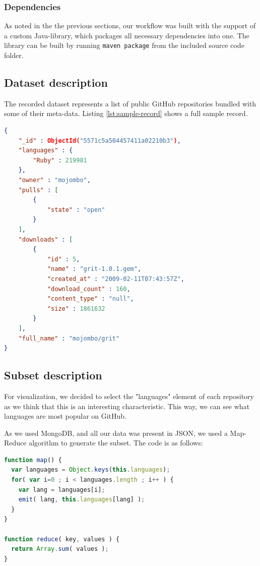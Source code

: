 \subsubsection{Dependencies}\label{sec:dependencies}

As noted in the the previous sections, our workflow was built with the support
of a custom Java-library, which packages all necessary dependencies into one.
The library can be built by running \texttt{maven package} from the included
source code folder.

\subsection{Dataset description}\label{sec:dataset-description}

The recorded dataset represents a list of public GitHub repositories bundled
with some of their meta-data. Listing \ref{lst:sample-record} shows a full
sample record.

\begin{lstlisting}[language=json,label=lst:sample-record]
{
    "_id" : ObjectId("5571c5a504457411a02210b3"),
    "languages" : {
        "Ruby" : 219981
    },
    "owner" : "mojombo",
    "pulls" : [
        {
            "state" : "open"
        }
    ],
    "downloads" : [
        {
            "id" : 5,
            "name" : "grit-1.0.1.gem",
            "created_at" : "2009-02-11T07:43:57Z",
            "download_count" : 160,
            "content_type" : "null",
            "size" : 1861632
        }
    ],
    "full_name" : "mojombo/grit"
}
\end{lstlisting}

\subsection{Subset description}\label{sec:subset-description}

For visualization, we decided to select the "languages" element of each
repository as we think that this is an interesting characteristic. This way, we
can see what languages are most popular on GitHub.

As we used MongoDB, and all our data was present in JSON, we used a Map-Reduce
algorithm to generate the subset. The code is as follows:

\begin{lstlisting}[language=javascript]
function map() {
  var languages = Object.keys(this.languages);
  for( var i=0 ; i < languages.length ; i++ ) {
    var lang = languages[i];
    emit( lang, this.languages[lang] );
  }
}

function reduce( key, values ) {
  return Array.sum( values );
}
\end{lstlisting}

